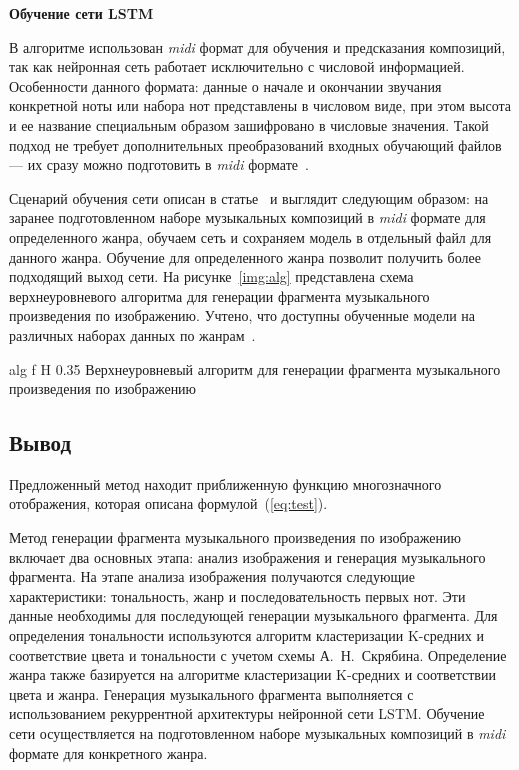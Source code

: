 \textbf{Обучение сети LSTM}

В алгоритме использован \textit{midi} формат для обучения и предсказания композиций, так как нейронная сеть работает исключительно с числовой информацией. 
Особенности данного формата: данные о начале и окончании звучания конкретной ноты или набора нот представлены в числовом виде, при этом высота и ее название специальным образом зашифровано в числовые значения. Такой подход не требует дополнительных преобразований входных обучающий файлов --- их сразу можно подготовить в \textit{midi} формате~\cite{nikitin2022}.

Сценарий обучения сети описан в статье~\cite{nikitin2022} и выглядит следующим образом: на заранее подготовленном наборе музыкальных композиций в \textit{midi} формате для определенного жанра, 
обучаем сеть и сохраняем модель в отдельный файл для данного жанра.
Обучение для определенного жанра позволит получить более подходящий выход сети.
На рисунке~\ref{img:alg} представлена схема верхнеуровневого алгоритма для генерации фрагмента музыкального произведения по изображению. Учтено, что доступны обученные модели на различных наборах данных по жанрам~\cite{nikitin2022}.

	{alg} %
	{f} %
	{H} %
	{0.35\textwidth} %
	{Верхнеуровневый алгоритм для генерации фрагмента музыкального произведения по изображению} %





\subsection*{Вывод}
Предложенный метод находит приближенную функцию многозначного отображения, которая описана формулой~(\ref{eq:test}).

Метод генерации фрагмента музыкального произведения по изображению включает два основных этапа: анализ изображения и генерация музыкального фрагмента. 
На этапе анализа изображения получаются следующие характеристики: тональность, жанр и последовательность первых нот. Эти данные необходимы для последующей генерации музыкального фрагмента.
Для определения тональности используются алгоритм кластеризации K-средних и соответствие цвета и тональности с учетом схемы А.~Н.~Скрябина.
Определение жанра также базируется на алгоритме кластеризации K-средних и соответствии цвета и жанра.
Генерация музыкального фрагмента выполняется с использованием рекуррентной архитектуры нейронной сети LSTM. 
Обучение сети осуществляется на подготовленном наборе музыкальных композиций в \textit{midi} формате для конкретного жанра. 


